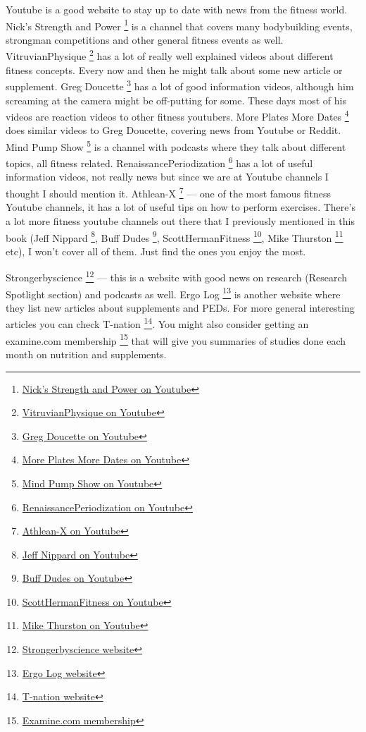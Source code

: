 \documentclass[openany, 12pt]{book}
\begin{document}
        Youtube is a good website to stay up to date with news from the fitness world. Nick's Strength and Power
        \footnote{\href{https://www.youtube.com/c/NicksStrengthandPower/videos}{Nick's Strength and Power on Youtube}} is a channel that covers many bodybuilding events, strongman competitions and
        other general fitness events as well. VitruvianPhysique
        \footnote{\href{https://www.youtube.com/user/VitruvianPhysique}{VitruvianPhysique on Youtube}} has a lot of really well explained videos about different fitness concepts. Every now
        and then he might talk about some new article or supplement. Greg Doucette
        \footnote{\href{https://www.youtube.com/user/gregdoucette/videos}{Greg Doucette on Youtube}} has a lot of good information videos, although him screaming at the camera might be
        off-putting for some. These days most of his videos are reaction videos to other fitness youtubers. More Plates More Dates
        \footnote{\href{https://www.youtube.com/c/MorePlatesMoreDates/videos}{More Plates More Dates on Youtube}} does similar videos to Greg Doucette, covering news from Youtube or
        Reddit. Mind Pump Show
        \footnote{\href{https://www.youtube.com/c/MindPumpShow/videos}{Mind Pump Show on Youtube}} is a channel with podcasts where they talk about different topics, all fitness related.
        RenaissancePeriodization
        \footnote{\href{https://www.youtube.com/c/RenaissancePeriodization/videos}{RenaissancePeriodization on Youtube}} has a lot of useful information videos, not really news but since we
        are at Youtube channels I thought I should mention it. Athlean-X
        \footnote{\href{https://www.youtube.com/c/athleanx/featured}{Athlean-X on Youtube}} --- one of the most famous fitness Youtube channels, it has a lot of useful tips on how to perform
        exercises. 
        There's a lot more fitness youtube channels out there that I previously mentioned in this book (Jeff Nippard
        \footnote{\href{https://www.youtube.com/c/JeffNippard}{Jeff Nippard on Youtube}}, Buff Dudes
        \footnote{\href{https://www.youtube.com/c/BuffDudesOfficial}{Buff Dudes on Youtube}}, ScottHermanFitness
        \footnote{\href{https://www.youtube.com/c/scottherman}{ScottHermanFitness on Youtube}}, Mike Thurston
        \footnote{\href{https://www.youtube.com/c/MikeThurston}{Mike Thurston on Youtube}} etc), I won't cover all of them. Just find the ones you enjoy the most.

        Strongerbyscience
        \footnote{\href{https://www.strongerbyscience.com/}{Strongerbyscience website}} --- this is a website with good news on research (Research Spotlight section) and podcasts as well.
        Ergo Log
        \footnote{\href{https://www.ergo-log.com/}{Ergo Log website}} is another website where they list new articles about supplements and PEDs.
        For more general interesting articles you can check T-nation
        \footnote{\href{https://www.t-nation.com/}{T-nation website}}. You might also consider getting an examine.com membership
        \footnote{\href{https://examine.com/store/membership/}{Examine.com membership}} that will give you summaries of studies done each month on nutrition and supplements.
        
\end{document}
